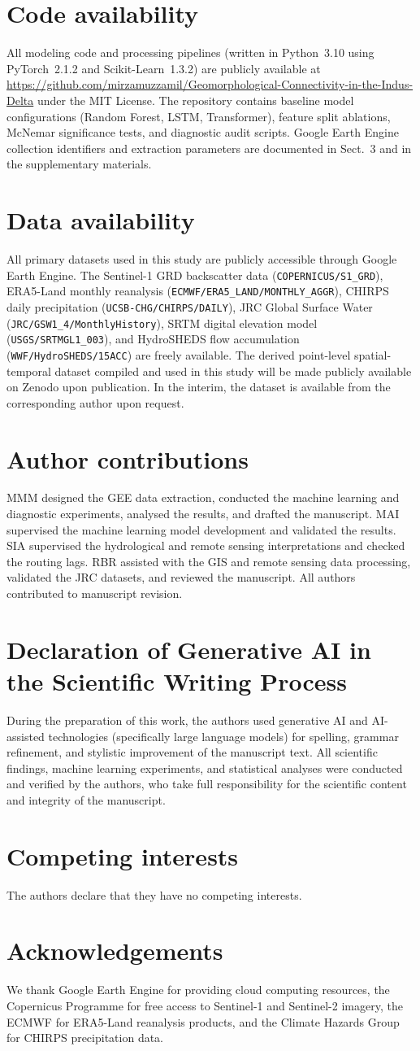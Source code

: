 \documentclass[12pt, a4paper]{article}
\newcommand{\codeavailability}{\section*{Code availability}}
\newcommand{\dataavailability}{\section*{Data availability}}
\newcommand{\authorcontribution}{\section*{Author contributions}}
\newcommand{\competinginterests}{\section*{Competing interests}}
\newcommand{\acknowledgements}{\section*{Acknowledgements}}
\begin{document}
\codeavailability
All modeling code and processing pipelines (written in Python~3.10 using
PyTorch~2.1.2 and Scikit-Learn~1.3.2) are publicly available at
\url{https://github.com/mirzamuzzamil/Geomorphological-Connectivity-in-the-Indus-Delta}
under the MIT License.
The repository contains baseline model configurations (Random Forest, LSTM,
Transformer), feature split ablations, McNemar significance tests, and
diagnostic audit scripts.
Google Earth Engine collection identifiers and extraction parameters are
documented in Sect.~3 and in the supplementary materials.

\dataavailability
All primary datasets used in this study are publicly accessible through
Google Earth Engine.
The Sentinel-1 GRD backscatter data (\verb|COPERNICUS/S1_GRD|),
ERA5-Land monthly reanalysis (\verb|ECMWF/ERA5_LAND/MONTHLY_AGGR|),
CHIRPS daily precipitation (\verb|UCSB-CHG/CHIRPS/DAILY|),
JRC Global Surface Water (\verb|JRC/GSW1_4/MonthlyHistory|),
SRTM digital elevation model (\verb|USGS/SRTMGL1_003|), and
HydroSHEDS flow accumulation (\verb|WWF/HydroSHEDS/15ACC|) are freely
available.
The derived point-level spatial-temporal dataset compiled and used in this study will be made publicly available on Zenodo upon publication. In the interim, the dataset is available from the corresponding author upon request.

\authorcontribution
MMM designed the GEE data extraction, conducted the machine learning and diagnostic experiments, analysed the results, and drafted the manuscript. MAI supervised the machine learning model development and validated the results. SIA supervised the hydrological and remote sensing interpretations and checked the routing lags. RBR assisted with the GIS and remote sensing data processing, validated the JRC datasets, and reviewed the manuscript. All authors contributed to manuscript revision.

\section*{Declaration of Generative AI in the Scientific Writing Process}
During the preparation of this work, the authors used generative AI and AI-assisted technologies (specifically large language models) for spelling, grammar refinement, and stylistic improvement of the manuscript text. All scientific findings, machine learning experiments, and statistical analyses were conducted and verified by the authors, who take full responsibility for the scientific content and integrity of the manuscript.

\competinginterests
The authors declare that they have no competing interests.

\acknowledgements
We thank Google Earth Engine for providing cloud computing resources, the
Copernicus Programme for free access to Sentinel-1 and Sentinel-2 imagery,
the ECMWF for ERA5-Land reanalysis products, and the Climate Hazards Group
for CHIRPS precipitation data.



\end{document}
